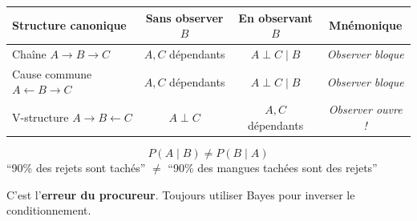 \documentclass[11pt,a4paper]{article}
\begin{document}
\vspace{0.5cm}

\begin{center}
\renewcommand{\arraystretch}{1.4}
\begin{tabular}{|l|c|c|c|}
\hline
\textbf{Structure canonique} & \textbf{Sans observer $B$} & \textbf{En observant $B$} & \textbf{Mnémonique} \\
\hline
Chaîne $A \to B \to C$ & $A, C$ dépendants & $A \perp C \mid B$ & \textit{Observer bloque} \\
\hline
Cause commune $A \leftarrow B \to C$ & $A, C$ dépendants & $A \perp C \mid B$ & \textit{Observer bloque} \\
\hline
V-structure $A \to B \leftarrow C$ & $A \perp C$ & $A, C$ dépendants & \textit{Observer ouvre !} \\
\hline
\end{tabular}
\end{center}

\vspace{0.5cm}

\begin{attentionbox}
$$P(A \mid B) \neq P(B \mid A)$$
``90\% des rejets sont tachés'' $\neq$ ``90\% des mangues tachées sont des rejets''

C'est l'\textbf{erreur du procureur}. Toujours utiliser Bayes pour inverser le conditionnement.
\end{attentionbox}
\end{document}
